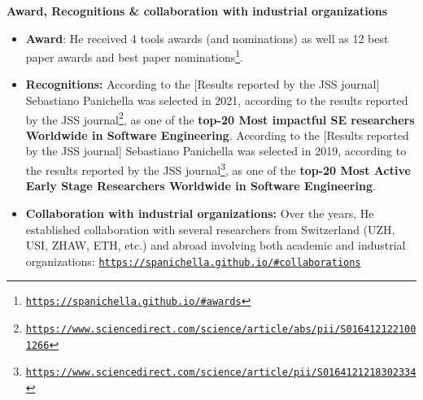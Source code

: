 \documentclass[11pt]{article}
\providecommand*\url[1]{\href{#1}{#1}}
\renewcommand*\url[1]{\href{#1}{\texttt{#1}}}
\begin{document}
\textbf{Award, Recognitions \& collaboration with industrial organizations}
\vspace{-2.5mm}
\begin{itemize}
  \item \textbf{Award}: He received 4 tools awards (and nominations) as well as 12 best paper awards and best paper nominations\footnote{\url{https://spanichella.github.io/\#awards}}.
   \vspace{-2mm}
  \item \textbf{Recognitions:} According to the [Results reported by the JSS journal] Sebastiano Panichella was selected in 2021, according to the results reported by the JSS journal\footnote{\url{https://www.sciencedirect.com/science/article/abs/pii/S0164121221001266}}, as one of the \textbf{top-20 Most impactful SE researchers Worldwide in Software Engineering}. According to the [Results reported by the JSS journal] Sebastiano Panichella was selected in 2019, according to the results reported by the JSS journal\footnote{\url{https://www.sciencedirect.com/science/article/pii/S0164121218302334}}, as one of the \textbf{top-20 Most Active Early Stage Researchers Worldwide in Software Engineering}. 
  \vspace{-2mm}
   \item \textbf{Collaboration with industrial organizations:} Over the years, He established collaboration with several researchers from Switzerland (UZH, USI, ZHAW, ETH, etc.) and abroad involving both academic and industrial organizations: \url{https://spanichella.github.io/\#collaborations}
\end{itemize}
%
\end{document}
